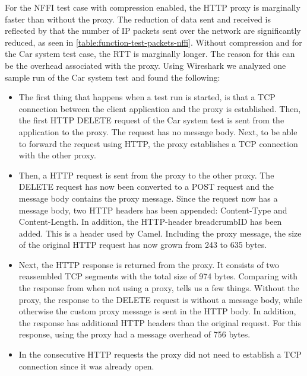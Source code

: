 For the NFFI test case with compression enabled, the HTTP proxy is marginally
faster than without the proxy. The reduction of data sent and received is
reflected by that the number of IP packets sent over the network are
significantly reduced, as seen in \cref{table:function-test-packets-nffi}.
Without compression and for the Car system test case, the RTT is marginally
longer. The reason for this can be the overhead associated with the proxy. Using
Wireshark we analyzed one sample run of the Car system test and found the
following:

\begin{itemize}

	\item The first thing that happens when a test run is started, is that a TCP
	connection between the client application and the proxy is established. Then,
	the first HTTP DELETE request of the Car system test is sent from the
	application to the proxy. The request has no message body. Next, to be able to
	forward the request using HTTP, the proxy establishes a TCP connection with the
	other proxy.

	\item Then, a HTTP request is sent from the proxy to the other proxy. The
	DELETE request has now been converted to a POST request and the message
	body contains the proxy message. Since the request now has a message body,
	two HTTP headers has been appended: Content-Type and Content-Length. In
	addition, the HTTP-header breadcrumbID has been added. This is a header used
	by Camel. Including the proxy message, the size of the original HTTP request
	has now grown from 243 to 635 bytes.

	\item Next, the HTTP response is returned from the proxy. It consists of two
	reassembled TCP segments with the total size of 974  bytes. Comparing with the
	response from when not using a proxy, tells us a few things. Without the proxy,
	the response to the DELETE request is without a message body, while otherwise
	the custom proxy message is sent in the HTTP body. In addition, the response
	has additional HTTP headers than the original request. For this response, using
	the proxy had a message overhead of 756 bytes.

    \item In the consecutive HTTP requests the proxy did not need to establish a
    TCP connection since it was already open.

  \end{itemize}

